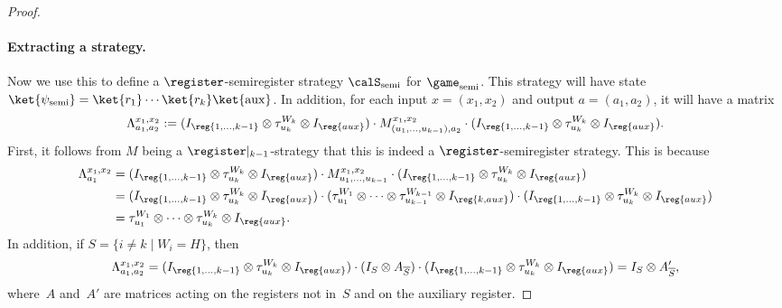 \begin{proof}
\paragraph{Extracting a strategy.}

Now we use this to define a $\register$-semiregister strategy $\calS_{\mathrm{semi}}$ for $\game_{\mathrm{semi}}$.
This strategy will have state $\ket{\psi_{\mathrm{semi}}} = \ket{r_1}\cdots\ket{r_k} \ket{\mathrm{aux}}$.
In addition, for each input $x = (x_1, x_2)$ and output $a = (a_1, a_2)$, it will have a matrix
\begin{equation*}
\Lambda_{a_1, a_2}^{x_1, x_2} := (I_{\reg{1, \ldots, k-1}} \otimes \tau^{W_k}_{u_k} \otimes I_{\reg{aux}})\cdot
M_{(u_1, \ldots, u_{k-1}),a_2}^{x_1, x_2} \cdot (I_{\reg{1, \ldots, k-1}} \otimes \tau^{W_k}_{u_k} \otimes I_{\reg{aux}}).
\end{equation*}
First, it follows from $M$ being a $\register|_{k-1}$-strategy that this is indeed a $\register$-semiregister strategy.
This is because
\begin{align*}
\Lambda_{a_1}^{x_1, x_2}
&= (I_{\reg{1, \ldots, k-1}} \otimes \tau^{W_k}_{u_k} \otimes I_{\reg{aux}})\cdot
	M_{u_1, \ldots, u_{k-1}}^{x_1, x_2} \cdot (I_{\reg{1, \ldots, k-1}} \otimes \tau^{W_k}_{u_k} \otimes I_{\reg{aux}})\\
&= (I_{\reg{1, \ldots, k-1}} \otimes \tau^{W_k}_{u_k} \otimes I_{\reg{aux}})\cdot
	(\tau^{W_1}_{u_1} \otimes \cdots \otimes \tau^{W_{k-1}}_{u_{k-1}} \otimes I_{\reg{k, aux}})
	\cdot (I_{\reg{1, \ldots, k-1}} \otimes \tau^{W_k}_{u_k} \otimes I_{\reg{aux}})\\
&= \tau^{W_1}_{u_1} \otimes \cdots \otimes \tau^{W_k}_{u_k} \otimes I_{\reg{aux}}.
\end{align*}
In addition, if $S = \{i \neq k \mid W_i = H\}$, then
\begin{equation*}
\Lambda_{a_1, a_2}^{x_1, x_2}
= (I_{\reg{1, \ldots, k-1}} \otimes \tau^{W_k}_{u_k} \otimes I_{\reg{aux}})\cdot
(I_S \otimes A_{\overline{S}}) \cdot (I_{\reg{1, \ldots, k-1}} \otimes \tau^{W_k}_{u_k} \otimes I_{\reg{aux}})
= I_S \otimes A'_{\overline{S}},
\end{equation*}
where~$A$ and~$A'$ are matrices acting on the registers not in~$S$ and on the auxiliary register.


\end{proof}
